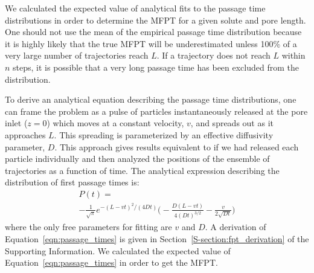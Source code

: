 \documentclass[journal=ancac3,manuscript=article,layout=twocolumn]{achemso}
\begin{document}
  We calculated the expected value of analytical fits to the passage time
  distributions in order to determine the MFPT for a given solute and pore
  length. One should not use the mean of the empirical passage time
  distribution because it is highly likely that the true MFPT will be
  underestimated unless 100\% of a very large number of trajectories reach $L$.
  If a trajectory does not reach $L$ within $n$ steps, it is possible that a
  very long passage time has been excluded from the distribution.
  
  To derive an analytical equation describing the passage time distributions,
  one can frame the problem as a pulse of particles instantaneously released at
  the pore inlet ($z=0$) which moves at a constant velocity, $v$, and spreads
  out as it approaches $L$. This spreading is parameterized by an effective
  diffusivity parameter, $D$. This approach gives results equivalent to if we
  had released each particle individually and then analyzed the positions of
  the ensemble of trajectories as a function of time. The analytical expression
  describing the distribution of first passage times
  is:~\cite{cussler_diffusion:_2009}
  \begin{equation}
  \begin{split}
  P(t) =~~~~~~~~~~~~~~~~~~~~~~~~~~~~~~~~~~~~~~~~~~~~~~~~~~~~~~~\\
  -\frac{1}{\sqrt{\pi}}e^{-(L - vt)^2 / (4Dt)}\bigg(-\frac{D(L - vt)}{4(Dt)^{3/2}} - \frac{v}{2\sqrt{Dt}}\bigg)
  \end{split}
  \label{eqn:passage_times}
  \end{equation} 
  where the only free parameters for fitting are $v$ and $D$. A derivation of
  Equation~\ref{eqn:passage_times} is given in
  Section~\ref{S-section:fpt_derivation} of the Supporting Information. We
  calculated the expected value of Equation~\ref{eqn:passage_times} in order to
  get the MFPT.
\end{document}
